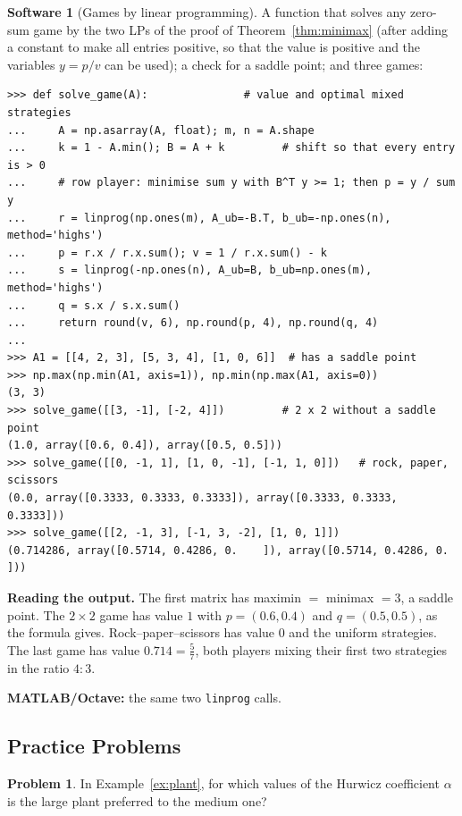 \documentclass[11pt,a4paper]{article}
\numberwithin{equation}{section}
\theoremstyle{definition}
\newtheorem{software}[thm]{Software}
\newtheorem{problemx}{Problem}[subsection]
\newenvironment{problem}{\begin{problemx}}{\end{problemx}}
\begin{document}
\begin{software}[Games by linear programming]
\label{sw:games}
A function that solves any zero-sum game by the two LPs of the proof of Theorem~\ref{thm:minimax} (after adding a constant to make all entries positive, so that the value is positive and the variables $y = p/v$ can be used); a check for a saddle point; and three games:
{\small\begin{verbatim}
>>> def solve_game(A):               # value and optimal mixed strategies
...     A = np.asarray(A, float); m, n = A.shape
...     k = 1 - A.min(); B = A + k         # shift so that every entry is > 0
...     # row player: minimise sum y with B^T y >= 1; then p = y / sum y
...     r = linprog(np.ones(m), A_ub=-B.T, b_ub=-np.ones(n), method='highs')
...     p = r.x / r.x.sum(); v = 1 / r.x.sum() - k
...     s = linprog(-np.ones(n), A_ub=B, b_ub=np.ones(m), method='highs')
...     q = s.x / s.x.sum()
...     return round(v, 6), np.round(p, 4), np.round(q, 4)
...
>>> A1 = [[4, 2, 3], [5, 3, 4], [1, 0, 6]]  # has a saddle point
>>> np.max(np.min(A1, axis=1)), np.min(np.max(A1, axis=0))
(3, 3)
>>> solve_game([[3, -1], [-2, 4]])         # 2 x 2 without a saddle point
(1.0, array([0.6, 0.4]), array([0.5, 0.5]))
>>> solve_game([[0, -1, 1], [1, 0, -1], [-1, 1, 0]])   # rock, paper, scissors
(0.0, array([0.3333, 0.3333, 0.3333]), array([0.3333, 0.3333, 0.3333]))
>>> solve_game([[2, -1, 3], [-1, 3, -2], [1, 0, 1]])
(0.714286, array([0.5714, 0.4286, 0.    ]), array([0.5714, 0.4286, 0.    ]))
\end{verbatim}}
\textbf{Reading the output.} The first matrix has maximin $=$ minimax $= 3$, a saddle point. The $2 \times 2$ game has value $1$ with $p = (0.6, 0.4)$ and $q = (0.5, 0.5)$, as the formula gives. Rock--paper--scissors has value $0$ and the uniform strategies. The last game has value $0.714 = \frac57$, both players mixing their first two
strategies in the ratio $4 : 3$.

\textbf{MATLAB/Octave:} the same two \texttt{linprog} calls.
\end{software}

\subsection{Practice Problems}

\begin{problem}
In Example~\ref{ex:plant}, for which values of the Hurwicz coefficient $\alpha$ is the large plant preferred to the medium one?
\end{problem}
\end{document}

